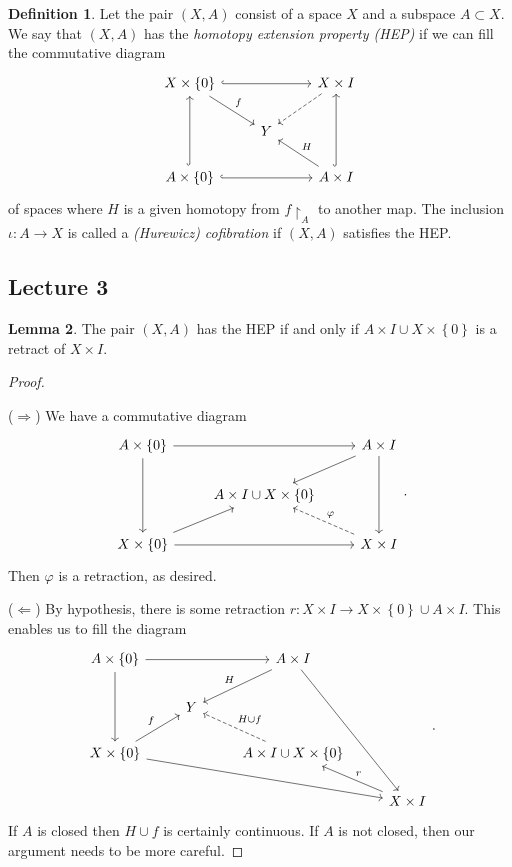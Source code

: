 \documentclass[10pt,letterpaper,cm]{nupset}
\theoremstyle{definition}
\newtheorem{definition}{Definition}[subsection]
\theoremstyle{theorem}
\newtheorem{lemma}[definition]{Lemma}
\theoremstyle{remark}
\newcommand{\1}{\mathbb{1}}
\newcommand{\0}{\vec 0}
\begin{document}
\begin{definition}
Let the pair $\left(X, A\right)$ consist of a space $X$ and a subspace $A \subset X$. We say that $\left(X, A\right)$ has the \textit{homotopy extension property \emph{(}HEP\emph{)}} if we can fill the commutative diagram
\[
\begin{tikzcd}
X\times \left\{0\right\} \arrow[rr, hook] \arrow[rd, "f"] &  & X\times I \arrow[ld, dashed] \\
 & Y &  \\
A\times \left\{0\right\} \arrow[uu, hook] \arrow[rr, hook] &  & A\times I \arrow[uu, hook] \arrow[lu, "H"']
\end{tikzcd}
\] of spaces where $H$ is a given homotopy from $f \restriction_{A}$ to another map. The inclusion $\iota : A \to X$ is called a \textit{(Hurewicz) cofibration} if $\left(X, A\right)$ satisfies the HEP.
\end{definition}

\subsection{Lecture 3}

\begin{lemma}
The pair $\left(X, A\right)$ has the HEP if and only if $A\times I \cup X \times \left\{0\right\}$ is a retract of $X\times I$.
\end{lemma}
\begin{proof} $ $

\smallskip

($\Longrightarrow$) We have a commutative diagram
\[
\begin{tikzcd}
A\times \left\{0\right\} \arrow[dd] \arrow[rr] &  & A\times I \arrow[ld] \arrow[dd] \\
 & A\times I \cup X \times \left\{0\right\} &  \\
X\times \left\{0\right\} \arrow[ru] \arrow[rr] &  & X\times I \arrow[lu, "\varphi"', dashed]
\end{tikzcd}
.\] Then $\varphi$ is a retraction, as desired. 

\medskip

($\Longleftarrow$) By hypothesis, there is some retraction $r: X\times I \to X\times \left\{0\right\} \cup A \times I$. This enables us to fill the diagram
\[
\begin{tikzcd}
A\times \left\{0\right\} \arrow[dd] \arrow[rr] &  & A\times I \arrow[ld, "H"'] \arrow[rddd] &  \\
 & Y &  &  \\
X\times \left\{0\right\} \arrow[ru, "f"] \arrow[rrrd] &  & A\times I \cup X \times \left\{0\right\} \arrow[lu, "H \cup f"', dashed] &  \\
 &  &  & X\times I \arrow[lu, "r"']
\end{tikzcd}
.\] If $A$ is closed then $H\cup f$ is certainly continuous. If $A$ is not closed, then our argument needs to be more careful. 
\end{proof}
\end{document}
